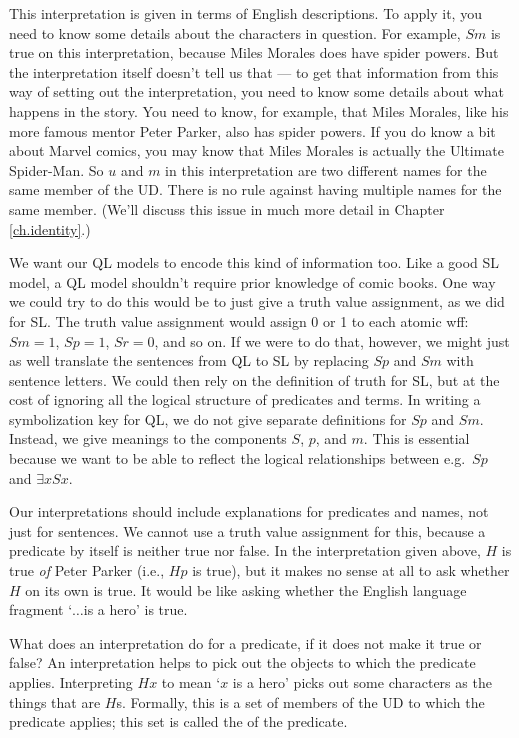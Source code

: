 This interpretation is given in terms of English descriptions. To apply it, you need to know some details about the characters in question. For example, $Sm$ is true on this interpretation, because Miles Morales does have spider powers. But the interpretation itself doesn't tell us that --- to get that information from this way of setting out the interpretation, you need to know some details about what happens in the story. You need to know, for example, that Miles Morales, like his more famous mentor Peter Parker, also has spider powers. If you do know a bit about Marvel comics, you may know that Miles Morales is actually the Ultimate Spider-Man. So $u$ and $m$ in this interpretation are two different names for the same member of the UD. There is no rule against having multiple names for the same member. (We'll discuss this issue in much more detail in Chapter \ref{ch.identity}.)

We want our QL models to encode this kind of information too. Like a good SL model, a QL model shouldn't require prior knowledge of comic books. One way we could try to do this would be to just give a truth value assignment, as we did for SL. The truth value assignment would assign 0 or 1 to each atomic wff: $Sm=1$, $Sp=1$, $Sr=0$, and so on. If we were to do that, however, we might just as well translate the sentences from QL to SL by replacing $Sp$ and $Sm$ with sentence letters. We could then rely on the definition of truth for SL, but at the cost of ignoring all the logical structure of predicates and terms. In writing a symbolization key for QL, we do not give separate definitions for $Sp$ and $Sm$. Instead, we give meanings to the components $S$, $p$, and $m$. This is essential because we want to be able to reflect the logical relationships between e.g.\ $Sp$ and $\exists x Sx$.

Our interpretations should include explanations for predicates and names, not just for sentences. We cannot use a truth value assignment for this, because a predicate by itself is neither true nor false. In the interpretation given above, $H$ is true \emph{of} Peter Parker (i.e., $Hp$ is true), but it makes no sense at all to ask whether $H$ on its own is true. It would be like asking whether the English language fragment `$\ldots$is a hero' is true.

What does an interpretation do for a predicate, if it does not make it true or false? An interpretation helps to pick out the objects to which the predicate applies. Interpreting $Hx$ to mean `$x$ is a hero' picks out some characters as the things that are $H$s. Formally, this is a set of members of the UD to which the predicate applies; this set is called the  of the predicate.

